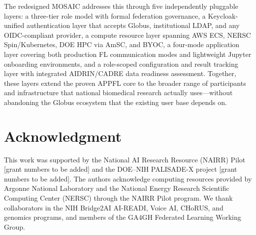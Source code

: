 \documentclass[conference]{IEEEtran}
\begin{document}
The redesigned MOSAIC addresses this through five independently
pluggable layers: a three-tier role model with formal federation
governance, a Keycloak-unified authentication layer that accepts
Globus, institutional LDAP, and any OIDC-compliant provider, a
compute resource layer spanning AWS ECS, NERSC Spin/Kubernetes, DOE
HPC via AmSC, and BYOC, a four-mode application layer covering both
production FL communication modes and lightweight Jupyter onboarding
environments, and a role-scoped configuration and result tracking layer
with integrated AIDRIN/CADRE data readiness assessment. Together, these
layers extend the proven APPFL core to the broader range of
participants and infrastructure that national biomedical research
actually uses---without abandoning the Globus ecosystem that the
existing user base depends on.

\section*{Acknowledgment}

This work was supported by the National AI Research Resource (NAIRR)
Pilot [grant numbers to be added] and the DOE--NIH PALISADE-X project
[grant numbers to be added]. The authors acknowledge computing
resources provided by Argonne National Laboratory and the National
Energy Research Scientific Computing Center (NERSC) through the NAIRR
Pilot program. We thank collaborators in the NIH Bridge2AI AI-READI,
Voice AI, CHoRUS, and genomics programs, and members of the GA4GH
Federated Learning Working Group.
\end{document}
